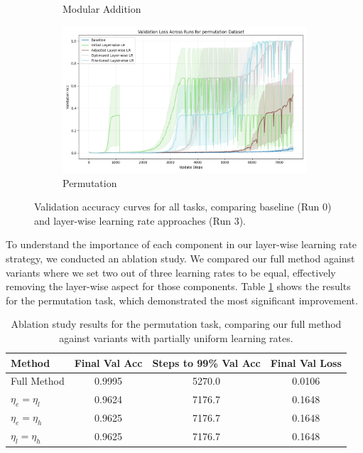 \documentclass{article} %
\begin{document}
\begin{figure}[h]
\begin{subfigure}{0.49\textwidth}
        \caption{Modular Addition}
        \label{fig:val_acc_add}
    \end{subfigure}
    \hfill
    \begin{subfigure}{0.49\textwidth}
        \includegraphics[width=\textwidth]{val_acc_permutation.png}
        \caption{Permutation}
        \label{fig:val_acc_perm}
    \end{subfigure}
    \caption{Validation accuracy curves for all tasks, comparing baseline (Run 0) and layer-wise learning rate approaches (Run 3).}
    \label{fig:all_tasks}
\end{figure}

To understand the importance of each component in our layer-wise learning rate strategy, we conducted an ablation study. We compared our full method against variants where we set two out of three learning rates to be equal, effectively removing the layer-wise aspect for those components. Table \ref{tab:ablation} shows the results for the permutation task, which demonstrated the most significant improvement.

\begin{table}[h]
\centering
\begin{tabular}{lccc}
\toprule
Method & Final Val Acc & Steps to 99\% Val Acc & Final Val Loss \\
\midrule
Full Method & 0.9995 & 5270.0 & 0.0106 \\
$\eta_e = \eta_l$ & 0.9624 & 7176.7 & 0.1648 \\
$\eta_e = \eta_h$ & 0.9625 & 7176.7 & 0.1648 \\
$\eta_l = \eta_h$ & 0.9625 & 7176.7 & 0.1648 \\
\bottomrule
\end{tabular}
\caption{Ablation study results for the permutation task, comparing our full method against variants with partially uniform learning rates.}
\label{tab:ablation}
\end{table}
\end{document}
